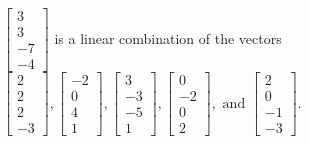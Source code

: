\begin{exercise}
\begin{exerciseStatement}
  \end{exerciseStatement}
  \begin{exerciseAnswer}
   \(\left[\begin{array}{c}
3 \\
3 \\
-7 \\
-4
\end{array}\right]\) 
  	 is  
	a linear combination of the vectors \(\left[\begin{array}{c}
2 \\
2 \\
2 \\
-3
\end{array}\right] , \left[\begin{array}{c}
-2 \\
0 \\
4 \\
1
\end{array}\right] , \left[\begin{array}{c}
3 \\
-3 \\
-5 \\
1
\end{array}\right] , \left[\begin{array}{c}
0 \\
-2 \\
0 \\
2
\end{array}\right] , \text{ and } \left[\begin{array}{c}
2 \\
0 \\
-1 \\
-3
\end{array}\right]\).

	
  


  \end{exerciseAnswer}
\end{exercise}